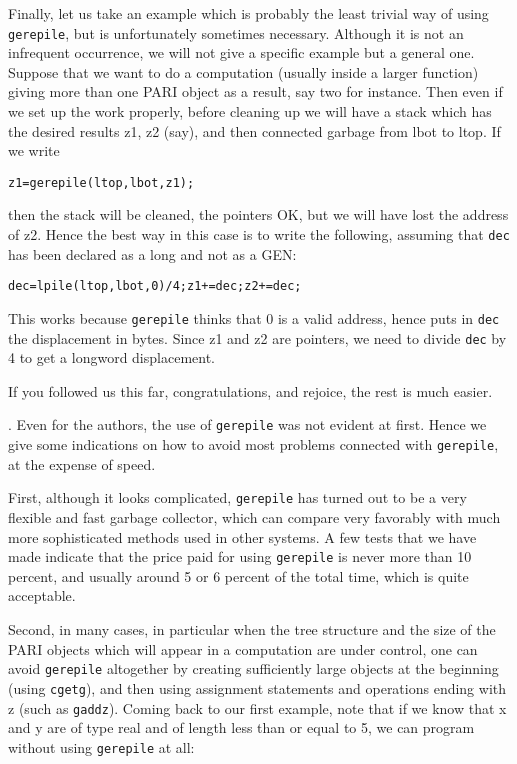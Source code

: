 Finally, let us take an example which is probably the least trivial way
of using {\tt gerepile}, but is unfortunately sometimes necessary. Although it
is not an infrequent occurrence, we will not give a specific example but
a general one. Suppose that we want to do a computation (usually inside
a larger function) giving more than one PARI object as a result, say two
for instance. Then even if we set up the work properly, before cleaning up
we will have a stack which has the desired results z1, z2 (say),
and then connected garbage from lbot to ltop. If we write

{\tt z1=gerepile(ltop,lbot,z1);}

then the stack will be cleaned, the pointers OK, but we will have lost the
address of z2. Hence the best way in this case is to write the following,
assuming that {\tt dec} has been declared as a long and not as a GEN:

{\tt dec=lpile(ltop,lbot,0)/4;z1+=dec;z2+=dec;}

This works because {\tt gerepile} thinks that 0 is a valid address, hence puts in
{\tt dec} the displacement in bytes. Since z1 and z2 are pointers, we need to
divide {\tt dec} by 4 to get a longword displacement.

If you followed us this far, congratulations, and rejoice, the rest is
much easier.

. Even for the authors, the use of {\tt gerepile}
was not evident at first. Hence we give some indications on how to avoid
most problems connected with {\tt gerepile}, at the expense of speed.

First, although it looks complicated, {\tt gerepile} has turned out to be a
very flexible and fast garbage collector, which can compare very favorably
with much more sophisticated methods used in other systems. A few tests
that we have made indicate that the price paid for using {\tt gerepile} is never
more than 10 percent, and usually around 5 or 6 percent of the total time,
which is quite acceptable.

Second, in many cases, in particular when the tree structure and the size
of the PARI objects which will appear in a computation are under control,
one can avoid {\tt gerepile} altogether by creating sufficiently large objects
at the beginning (using {\tt cgetg}), and then using assignment statements and
operations ending with z (such as {\tt gaddz}). Coming back to our first example,
note that if we know that x and y are of type real and of length less than or
equal to 5, we can program without using {\tt gerepile} at all:

